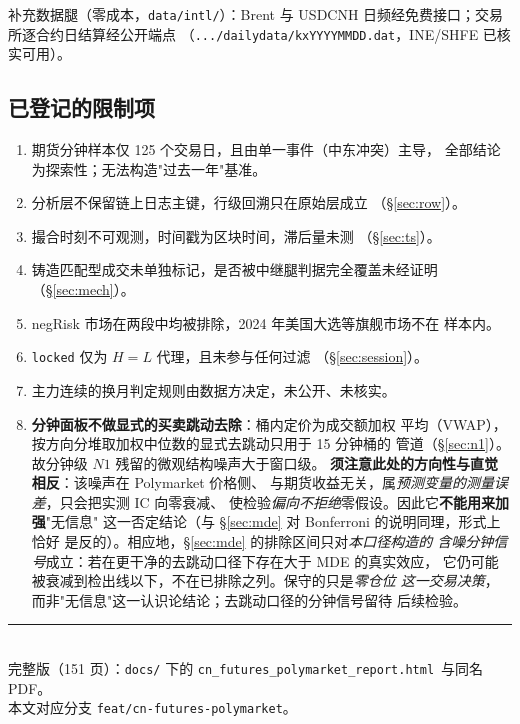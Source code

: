 \documentclass[11pt, a4paper]{ctexart}
\newcommand{\code}[1]{\texttt{\small #1}}
\begin{document}
\noindent 补充数据腿（零成本，\code{data/intl/}）：Brent 与 USDCNH
日频经免费接口；交易所逐合约日结算经公开端点
（\code{.../dailydata/kxYYYYMMDD.dat}，INE/SHFE 已核实可用）。

\subsection{已登记的限制项}

\begin{enumerate}
\item 期货分钟样本仅 125 个交易日，且由单一事件（中东冲突）主导，
  全部结论为探索性；无法构造"过去一年"基准。
\item 分析层不保留链上日志主键，行级回溯只在原始层成立
  （\S\ref{sec:row}）。
\item 撮合时刻不可观测，时间戳为区块时间，滞后量未测
  （\S\ref{sec:ts}）。
\item 铸造匹配型成交未单独标记，是否被中继腿判据完全覆盖未经证明
  （\S\ref{sec:mech}）。
\item negRisk 市场在两段中均被排除，2024 年美国大选等旗舰市场不在
  样本内。
\item \code{locked} 仅为 $H=L$ 代理，且未参与任何过滤
  （\S\ref{sec:session}）。
\item 主力连续的换月判定规则由数据方决定，未公开、未核实。
\item \textbf{分钟面板不做显式的买卖跳动去除}：桶内定价为成交额加权
  平均（VWAP），按方向分堆取加权中位数的显式去跳动只用于 15 分钟桶的
  管道（\S\ref{sec:n1}）。故分钟级 $N1$ 残留的微观结构噪声大于窗口级。
  \textbf{须注意此处的方向性与直觉相反}：该噪声在 Polymarket 价格侧、
  与期货收益无关，属\emph{预测变量的测量误差}，只会把实测 IC 向零衰减、
  使检验\emph{偏向不拒绝}零假设。因此它\textbf{不能用来加强}"无信息"
  这一否定结论（与 §\ref{sec:mde} 对 Bonferroni 的说明同理，形式上恰好
  是反的）。相应地，§\ref{sec:mde} 的排除区间只对\emph{本口径构造的
  含噪分钟信号}成立：若在更干净的去跳动口径下存在大于 MDE 的真实效应，
  它仍可能被衰减到检出线以下，不在已排除之列。保守的只是\emph{零仓位
  这一交易决策}，而非"无信息"这一认识论结论；去跳动口径的分钟信号留待
  后续检验。
\end{enumerate}

\vspace{1em}
\noindent\rule{\textwidth}{0.4pt}\\
\small 完整版（151 页）：\code{docs/} 下的
\code{cn\_futures\_polymarket\_report.html}\ 与同名 PDF。\\
本文对应分支 \code{feat/cn-futures-polymarket}。
\end{document}
